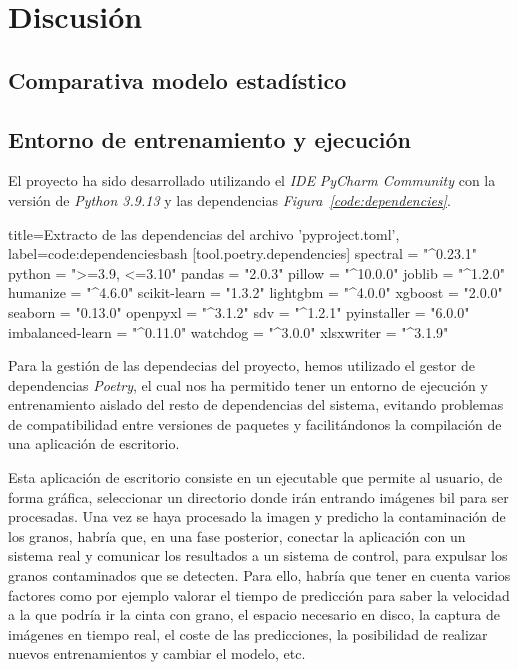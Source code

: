 \section{Discusión}

\subsection{Comparativa modelo estadístico}


\subsection{Entorno de entrenamiento y ejecución}

El proyecto ha sido desarrollado utilizando el \textit{IDE} \textit{PyCharm Community} con la versión de \textit{Python 3.9.13} y las dependencias \textit{Figura\ \ref{code:dependencies}}.

\begin{code}[]{title=Extracto de las dependencias del archivo 'pyproject.toml', label=code:dependencies}{bash}
    [tool.poetry.dependencies]    
    spectral = "^0.23.1"
    python = ">=3.9, <=3.10"
    pandas = "2.0.3"
    pillow = "^10.0.0"
    joblib = "^1.2.0"
    humanize = "^4.6.0"
    scikit-learn = "1.3.2"
    lightgbm = "^4.0.0"
    xgboost = "2.0.0"
    seaborn = "0.13.0"
    openpyxl = "^3.1.2"
    sdv = "^1.2.1"
    pyinstaller = "6.0.0"
    imbalanced-learn = "^0.11.0"
    watchdog = "^3.0.0"
    xlsxwriter = "^3.1.9"
\end{code}

Para la gestión de las dependecias del proyecto, hemos utilizado el gestor de dependencias \textit{Poetry}, el cual nos ha permitido tener un entorno de ejecución y entrenamiento aislado del resto de dependencias del sistema, evitando problemas de compatibilidad entre versiones de paquetes y facilitándonos la compilación de una aplicación de escritorio.

Esta aplicación de escritorio consiste en un ejecutable que permite al usuario, de forma gráfica, seleccionar un directorio donde irán entrando imágenes \gls{bil} para ser procesadas. Una vez se haya procesado la imagen y predicho la contaminación de los granos, habría que, en una fase posterior, conectar la aplicación con un sistema real y comunicar los resultados a un sistema de control, para expulsar los granos contaminados que se detecten. Para ello, habría que tener en cuenta varios factores como por ejemplo valorar el tiempo de predicción para saber la velocidad a la que podría ir la cinta con grano, el espacio necesario en disco, la captura de imágenes en tiempo real, el coste de las predicciones, la posibilidad de realizar nuevos entrenamientos y cambiar el modelo, etc.


